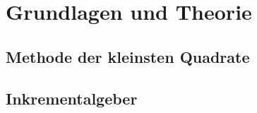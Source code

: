 \section{Grundlagen und Theorie}

\subsection{Methode der kleinsten Quadrate}

\subsection{Inkrementalgeber}